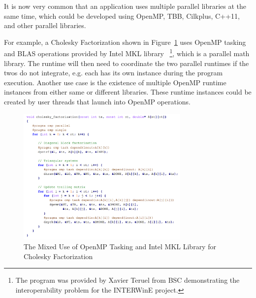 It is now very common that an application uses multiple parallel libraries at the same time, which could be developed 
using OpenMP, TBB, Cilkplus, C++11, and other parallel libraries. 

For example, a Cholesky Factorization shown in Figure~\ref{fig:cholesky} uses OpenMP 
tasking and BLAS operations provided by Intel MKL library
~\footnote{The program was provided by Xavier Teruel from BSC demonstrating the interoperability problem for the INTERWinE project.}, 
which is a parallel math library. The runtime will then need to coordinate the two
parallel runtimes if the twos do not integrate, e.g. each has its own instance during the program execution. Another use case is the existence of multiple OpenMP runtime instances from either same or different libraries. These runtime instances could be created by user threads that launch into
OpenMP operations. 
\begin{figure}[h!]
  \centering
      \includegraphics[width=0.75\textwidth]{images/cholesky}
      \caption{The Mixed Use of OpenMP Tasking and Intel MKL Library for Cholesky Factorization~\cite{intertwine}}
 \label{fig:cholesky}
\end{figure}
